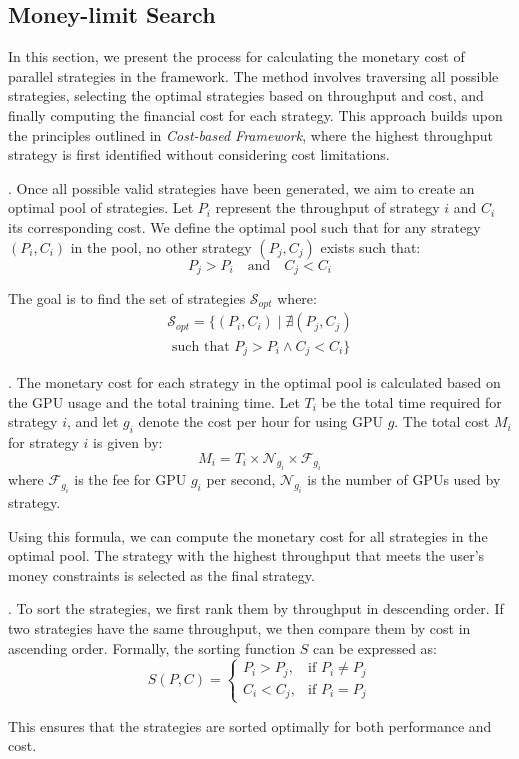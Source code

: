 \subsection{Money-limit Search}\label{sec:scheme:money}

In this section, we present the process for calculating the monetary cost of parallel strategies in the \sysname framework. The method involves traversing all possible strategies, selecting the optimal strategies based on throughput and cost, and finally computing the financial cost for each strategy. This approach builds upon the principles outlined in \textit{Cost-based \sysname Framework}, where the highest throughput strategy is first identified without considering cost limitations.

. Once all possible valid strategies have been generated, we aim to create an optimal pool of strategies. Let $P_i$ represent the throughput of strategy $i$ and $C_i$ its corresponding cost. We define the optimal pool such that for any strategy $(P_i, C_i)$ in the pool, no other strategy $(P_j, C_j)$ exists such that:
\begin{equation}
    P_j > P_i \quad \text{and} \quad C_j < C_i
\end{equation}

The goal is to find the set of strategies $\mathcal{S}_{opt}$ where:
\begin{align}
    \mathcal{S}_{opt} = \{ (P_i, C_i) \mid \nexists (P_j, C_j) 
    \\
    \text{ such that } P_j > P_i \land C_j < C_i \}
\end{align}

. The monetary cost for each strategy in the optimal pool is calculated based on the GPU usage and the total training time. Let $T_i$ be the total time required for strategy $i$, and let $g_i$ denote the cost per hour for using GPU $g$. The total cost $M_i$ for strategy $i$ is given by:
\begin{equation}
    M_i = T_i \times \mathcal{N}_{g_i} \times \mathcal{F}_{g_i}
\end{equation}
where $\mathcal{F}_{g_i}$ is the fee for GPU $g_i$ per second, $\mathcal{N}_{g_i}$  is the number of GPUs used by strategy.

Using this formula, we can compute the monetary cost for all strategies in the optimal pool. The strategy with the highest throughput  that meets the user's money constraints is selected as the final strategy.

. To sort the strategies, we first rank them by throughput in descending order. If two strategies have the same throughput, we then compare them by cost in ascending order. Formally, the sorting function $S$ can be expressed as:
\begin{equation}
    S(P, C) = \begin{cases} 
    P_i > P_j, & \text{if } P_i \neq P_j \\
    C_i < C_j, & \text{if } P_i = P_j 
    \end{cases}
\end{equation}

This ensures that the strategies are sorted optimally for both performance and cost.